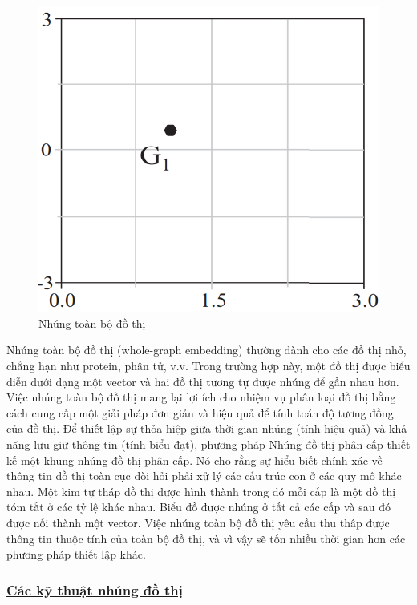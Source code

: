 \begin{figure}[htp]
	\centering
	\includegraphics[width=6 cm]{images/graph_emb_5.png}
	\caption{Nhúng toàn bộ đồ thị}
	\label{fig:wholeGraphEmbedding}
\end{figure}

Nhúng toàn bộ đồ thị (whole-graph embedding) thường dành cho các đồ thị nhỏ, chẳng hạn như protein, phân tử, v.v. Trong trường hợp này, một đồ thị được biểu diễn dưới dạng một vector và hai đồ thị tương tự được nhúng để gần nhau hơn. Việc nhúng toàn bộ đồ thị mang lại lợi ích cho nhiệm vụ phân loại đồ thị bằng cách cung cấp một giải pháp đơn giản và hiệu quả để tính toán độ tương đồng của đồ thị. Để thiết lập sự thỏa hiệp giữa thời gian nhúng (tính hiệu quả) và khả năng lưu giữ thông tin (tính biểu đạt), phương pháp Nhúng đồ thị phân cấp \cite{mousavi2017hierarchical} thiết kế một khung nhúng đồ thị phân cấp. Nó cho rằng sự hiểu biết chính xác về thông tin đồ thị toàn cục đòi hỏi phải xử lý các cấu trúc con ở các quy mô khác nhau. Một kim tự tháp đồ thị được hình thành trong đó mỗi cấp là một đồ thị tóm tắt ở các tỷ lệ khác nhau. Biểu đồ được nhúng ở tất cả các cấp và sau đó được nối thành một vector. Việc nhúng toàn bộ đồ thị yêu cầu thu thâp được thông tin thuộc tính của toàn bộ đồ thị, và vì vậy sẽ tốn nhiều thời gian hơn các phương pháp thiết lập khác.

\subsubsection{\underline{Các kỹ thuật nhúng đồ thị}}

